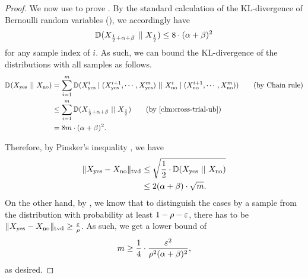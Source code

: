 \begin{proof}
	We now use  to prove . By the standard calculation of the KL-divergence of Bernoulli random variables (), we accordingly have
	\begin{align*}
		\mathbb{D}(X_{\frac{1}{2}+\alpha+\beta}~||~X_{\frac{1}{2}}) \leq 8 \cdot (\alpha+\beta)^2
	\end{align*}
	for any sample index of $i$. As such, we can bound the KL-divergence of the distributions with all samples as follows.
	\begin{align*}
		\kl{\Xyes}{\Xno} &= \sum_{i=1}^{m} \kl{\Xyes^{i}\mid (\Xyes^{i+1},\cdots, \Xyes^{m})}{\Xno^{i}\mid (\Xno^{i+1},\cdots, \Xno^{m})} \tag{by Chain rule}\\
		&\leq \sum_{i=1}^{m} \kl{\Xhigh}{\Xflat} \tag{by \Cref{clm:cross-trial-ub}}\\
		&= 8m\cdot (\alpha+\beta)^2.
	\end{align*}
	
	Therefore, by Pinsker's inequality , we have %
	\begin{align*}
		\|X_{\text{yes}} - X_{\text{no}}\|_{\mathrm{tvd}} & \leq \sqrt{\frac{1}{2}\cdot \mathbb{D}(X_{\text{yes}}~||~X_{\text{no}})}\\
		& \leq 2 (\alpha+\beta) \cdot \sqrt{m}.
	\end{align*}
	On the other hand, by , we know that to distinguish the cases by a sample from the distribution with probability at least $1-\rho-\varepsilon$, there has to be $\|X_{\text{yes}} - X_{\text{no}}\|_{\mathrm{tvd}}\geq \frac{\varepsilon}{\rho}$. As such, we get a lower bound of
	\begin{align*}
		m \geq \frac{1}{4}\cdot \frac{\varepsilon^2}{\rho^2 (\alpha+\beta)^2},	
	\end{align*}
	as desired.
\end{proof}


